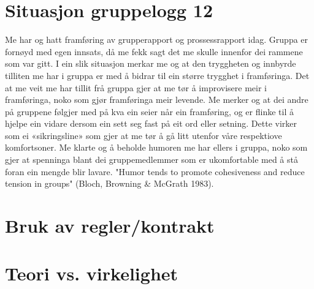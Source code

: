 \section{Situasjon gruppelogg 12}
Me har og hatt framføring av grupperapport og prossessrapport idag. Gruppa er fornøyd med egen innsats, då me fekk sagt det me skulle innenfor dei rammene som var gitt. I ein slik situasjon merkar me og at den tryggheten og innbyrde tilliten me har i gruppa er med å bidrar til ein større trygghet i framføringa. Det at me veit me har tillit frå gruppa gjer at me tør å improvisere meir i framføringa, noko som gjør framføringa meir levende. Me merker og at dei andre på gruppene følgjer med på kva ein seier når ein framføring, og er flinke til å hjelpe ein vidare dersom ein sett seg fast på eit ord eller setning. Dette virker som ei «sikringsline» som gjer at me tør å gå litt utenfor våre respektiove komfortsoner.  Me klarte og å beholde humoren me har ellers i gruppa, noko som gjer at spenninga blant dei gruppemedlemmer som er ukomfortable med å stå foran ein mengde blir lavare. "Humor tends to promote cohesiveness and reduce tension in groups" (Bloch, Browning \& McGrath 1983).

\section{Bruk av regler/kontrakt}

\section{Teori vs. virkelighet}

